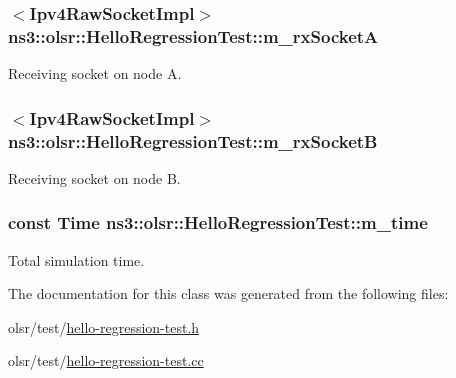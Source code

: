 \subsubsection[{\texorpdfstring{m\+\_\+rx\+SocketA}{m_rxSocketA}}]{$<${\bf Ipv4\+Raw\+Socket\+Impl}$>$ ns3\+::olsr\+::\+Hello\+Regression\+Test\+::m\+\_\+rx\+SocketA\hspace{0.3cm}{\ttfamily [private]}}\hypertarget{classns3_1_1olsr_1_1HelloRegressionTest_a09824a508053ac7482c72babc4976558}{}\label{classns3_1_1olsr_1_1HelloRegressionTest_a09824a508053ac7482c72babc4976558}


Receiving socket on node A. 

\subsubsection[{\texorpdfstring{m\+\_\+rx\+SocketB}{m_rxSocketB}}]{$<${\bf Ipv4\+Raw\+Socket\+Impl}$>$ ns3\+::olsr\+::\+Hello\+Regression\+Test\+::m\+\_\+rx\+SocketB\hspace{0.3cm}{\ttfamily [private]}}\hypertarget{classns3_1_1olsr_1_1HelloRegressionTest_a36afc1d537401f41ec4a5d899584cdcb}{}\label{classns3_1_1olsr_1_1HelloRegressionTest_a36afc1d537401f41ec4a5d899584cdcb}


Receiving socket on node B. 

\subsubsection[{\texorpdfstring{m\+\_\+time}{m_time}}]{\setlength{\rightskip}{0pt plus 5cm}const {\bf Time} ns3\+::olsr\+::\+Hello\+Regression\+Test\+::m\+\_\+time\hspace{0.3cm}{\ttfamily [private]}}\hypertarget{classns3_1_1olsr_1_1HelloRegressionTest_a3f8d630c066f0cb7fc33cd7174d05594}{}\label{classns3_1_1olsr_1_1HelloRegressionTest_a3f8d630c066f0cb7fc33cd7174d05594}


Total simulation time. 



The documentation for this class was generated from the following files\+:\begin{DoxyCompactItemize}
\item 
olsr/test/\hyperlink{hello-regression-test_8h}{hello-\/regression-\/test.\+h}\item 
olsr/test/\hyperlink{hello-regression-test_8cc}{hello-\/regression-\/test.\+cc}\end{DoxyCompactItemize}
